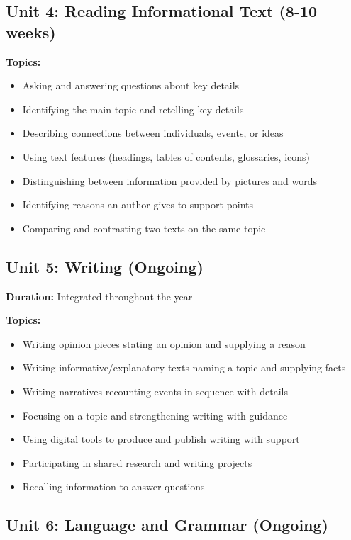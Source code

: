 \documentclass[11pt,letterpaper]{report}
\begin{document}
\subsection{Unit 4: Reading Informational Text (8-10 weeks)}

\textbf{Topics:}
\begin{itemize}
    \item Asking and answering questions about key details
    \item Identifying the main topic and retelling key details
    \item Describing connections between individuals, events, or ideas
    \item Using text features (headings, tables of contents, glossaries, icons)
    \item Distinguishing between information provided by pictures and words
    \item Identifying reasons an author gives to support points
    \item Comparing and contrasting two texts on the same topic
\end{itemize}

\subsection{Unit 5: Writing (Ongoing)}

\textbf{Duration:} Integrated throughout the year

\textbf{Topics:}
\begin{itemize}
    \item Writing opinion pieces stating an opinion and supplying a reason
    \item Writing informative/explanatory texts naming a topic and supplying facts
    \item Writing narratives recounting events in sequence with details
    \item Focusing on a topic and strengthening writing with guidance
    \item Using digital tools to produce and publish writing with support
    \item Participating in shared research and writing projects
    \item Recalling information to answer questions
\end{itemize}

\subsection{Unit 6: Language and Grammar (Ongoing)}
\end{document}

